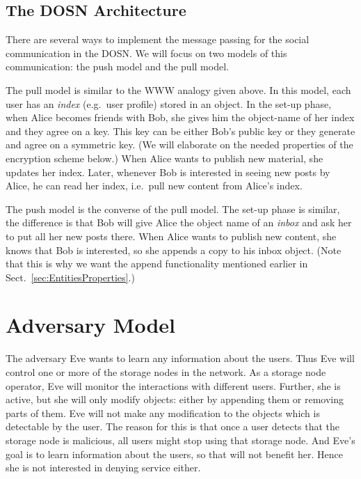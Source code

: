 \subsection{The \acs{DOSN} Architecture}\label{sec:DOSN}

There are several ways to implement the message passing for the social 
communication in the \ac{DOSN}.
We will focus on two models of this communication: the push model and the pull 
model.

The pull model is similar to the \ac{WWW} analogy given above.
In this model, each user has an \emph{index} (e.g.\ user profile) stored in an 
object.
In the set-up phase, when Alice becomes friends with Bob, she gives him the 
object-name of her index and they agree on a key.
This key can be either Bob's public key or they generate and agree on 
a symmetric key.
(We will elaborate on the needed properties of the encryption scheme below.)
When Alice wants to publish new material, she updates her index.
Later, whenever Bob is interested in seeing new posts by Alice, he can read her 
index, i.e.\ pull new content from Alice's index.

The push model is the converse of the pull model.
The set-up phase is similar, the difference is that Bob will give Alice the 
object name of an \emph{inbox} and ask her to put all her new posts there.
When Alice wants to publish new content, she knows that Bob is interested, so 
she appends a copy to his inbox object.
(Note that this is why we want the append functionality mentioned earlier in 
Sect.~\ref{sec:EntitiesProperties}.)


\section{Adversary Model}\label{sec:Adversary}

The adversary Eve wants to learn any information about the users.
Thus Eve will control one or more of the storage nodes in the network.
As a storage node operator, Eve will monitor the interactions with different 
users.
Further, she is active, but she will only modify objects: either by appending 
them or removing parts of them.
Eve will not make any modification to the objects which is detectable by the 
user.
The reason for this is that once a user detects that the storage node is 
malicious, all users might stop using that storage node.
And Eve's goal is to learn information about the users, so that will not 
benefit her.
Hence she is not interested in denying service either.

